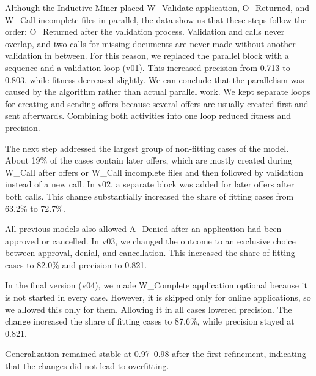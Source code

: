 \documentclass[
  english,        %
  font=times,     %
  twocolumn,      %
]{tumarticle}
\begin{document}
Although the Inductive Miner placed W\_Validate application, O\_Returned, and W\_Call incomplete files in parallel, the data show us that these steps follow the order: O\_Returned after the validation process. Validation and calls never overlap, and two calls for missing documents are never made without another validation in between. For this reason, we replaced the parallel block with a sequence and a validation loop (v01). This increased precision from 0.713 to 0.803, while fitness decreased slightly. We can conclude that the parallelism was caused by the algorithm rather than actual parallel work. We kept separate loops for creating and sending offers because several offers are usually created first and sent afterwards. Combining both activities into one loop reduced fitness and precision.

The next step addressed the largest group of non-fitting cases of the model. About 19\% of the cases contain later offers, which are mostly created during W\_Call after offers or W\_Call incomplete files and then followed by validation instead of a new call. In v02, a separate block was added for later offers after both calls. This change substantially increased the share of fitting cases from 63.2\% to 72.7\%.

All previous models also allowed A\_Denied after an application had been approved or cancelled. In v03, we changed the outcome to an exclusive choice between approval, denial, and cancellation. This increased the share of fitting cases to 82.0\% and precision to 0.821.

In the final version (v04), we made W\_Complete application optional because it is not started in every case. However, it is skipped only for online applications, so we allowed this only for them. Allowing it in all cases lowered precision. The change increased the share of fitting cases to 87.6\%, while precision stayed at 0.821.

Generalization remained stable at 0.97--0.98 after the first refinement, indicating that the changes did not lead to overfitting.

\begin{table}[!htb]
    \caption{Iterative refinement of the process model (test set). v00 is IM 0.2; each version changes the previous one. Fitting cases, precision and generalization are alignment-based.}
    \label{tab:versions}
    \centering
    \footnotesize
    \setlength{\tabcolsep}{1.8pt}
    
\end{table}
\end{document}

